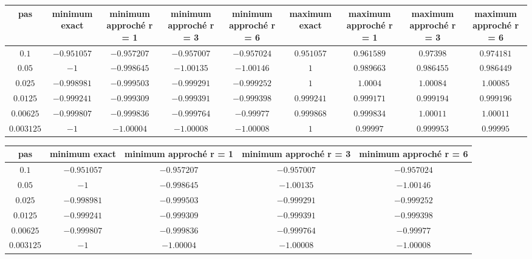 \documentclass[11pt,a4paper]{report}
\begin{document}
				\begin{center}
					\begin{tabular}{|c|c|c|c|c|c|c|c|c|}
						\hline
						pas & minimum exact & minimum approché r = 1 & minimum approché r = 3 & minimum approché r = 6 & maximum exact & maximum approché r = 1 & maximum approché r = 3 & maximum approché r = 6 \\
						\hline 
						$0.1$ & $-0.951057$ & $-0.957207$ & $-0.957007$ & $-0.957024$ & $ 0.951057 $ & $ 0.961589 $ & $ 0.97398 $ & $ 0.974181 $ \\ 
						\hline 
						$0.05$ & $-1$ & $-0.998645$ & $-1.00135$ & $-1.00146$ & $ 1 $ & $ 0.989663 $ & $ 0.986455 $ & $ 0.986449 $\\ 
						\hline 
						$0.025$ & $-0.998981$ & $-0.999503$ & $-0.999291$ & $-0.999252$ & $ 1 $ & $ 1.0004 $ & $ 1.00084 $ & $ 1.00085 $  \\ 
						\hline 
						$0.0125$ & $-0.999241$ & $-0.999309$ & $-0.999391 $ & $-0.999398$ & $ 0.999241 $ & $ 0.999171 $ & $ 0.999194 $ & $ 0.999196 $\\ 
						\hline
						$0.00625$ & $-0.999807$ & $-0.999836$ & $-0.999764$ & $-0.99977$ & $ 0.999868 $ & $ 0.999834 $ & $ 1.00011 $ & $ 1.00011 $ \\ 
						\hline 
						$0.003125$ & $-1$ & $-1.00004$ & $-1.00008$ & $-1.00008$ & $ 1 $ & $ 0.99997 $ & $ 0.999953 $ & $ 0.99995 $ \\ 
						\hline 
					\end{tabular} 
				\end{center}

				\begin{center}
					\begin{tabular}{|c|c|c|c|c|}
						\hline
						pas & minimum exact & minimum approché r = 1 & minimum approché r = 3 & minimum approché r = 6 \\
						\hline 
						$0.1$ & $-0.951057$ & $-0.957207$ & $-0.957007$ & $-0.957024$  \\ 
						\hline 
						$0.05$ & $-1$ & $-0.998645$ & $-1.00135$ & $-1.00146$\\ 
						\hline 
						$0.025$ & $-0.998981$ & $-0.999503$ & $-0.999291$ & $-0.999252$\\ 
						\hline 
						$0.0125$ & $-0.999241$ & $-0.999309$ & $-0.999391 $ & $-0.999398$\\ 
						\hline
						$0.00625$ & $-0.999807$ & $-0.999836$ & $-0.999764$ & $-0.99977$\\ 
						\hline 
						$0.003125$ & $-1$ & $-1.00004$ & $-1.00008$ & $-1.00008$\\ 
						\hline 
					\end{tabular} 
				\end{center}
\end{document}
